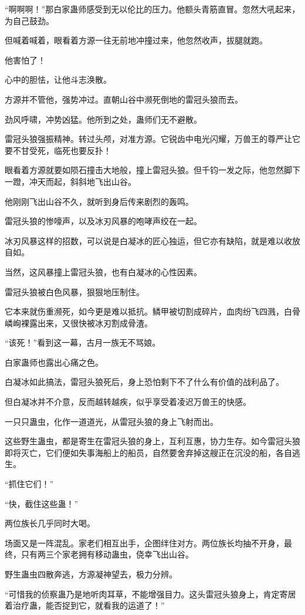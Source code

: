 \begin{this_body}
“啊啊啊！”那白家蛊师感受到无以伦比的压力。他额头青筋直冒。忽然大吼起来，为自己鼓劲。

但喊着喊着，眼看着方源一往无前地冲撞过来，他忽然收声，拔腿就跑。

他害怕了！

心中的胆怯，让他斗志涣散。

方源并不管他，强势冲过。直朝山谷中濒死倒地的雷冠头狼而去。

劲风呼啸，冲势凶猛。他所到之处，蛊师们无不避散。

雷冠头狼强振精神。转过头颅，对准方源。它锐齿中电光闪耀，万兽王的尊严让它要不甘受死，临死也要反扑！

眼看着方源就要如陨石撞击大地般，撞上雷冠头狼。但千钧一发之际，他忽然脚下一蹬，冲天而起，斜斜地飞出山谷。

他刚刚飞出山谷不久，就听到身后传来剧烈的轰鸣。

雷冠头狼的惨嚎声，以及冰刃风暴的咆哮声绞在一起。

冰刃风暴这样的招数，可以说是白凝冰的匠心独运，但它亦有缺陷，就是难以收放自如。

当然，这风暴撞上雷冠头狼，也有白凝冰的心性因素。

雷冠头狼被白色风暴，狠狠地压制住。

它本来就伤重濒死，如今更是难以抵抗。鳞甲被切割成碎片，血肉纷飞四溅，白骨嶙峋裸露出来，又很快被冰刃割成骨渣。

“该死！”看到这一幕，古月一族无不骂娘。

白家蛊师也露出心痛之色。

白凝冰如此搞法，雷冠头狼死后，身上恐怕剩下不了什么有价值的战利品了。

但白凝冰并不介意，反而越转越疾，似乎享受着凌迟万兽王的快感。

一只只蛊虫，化作一道道光，从雷冠头狼的身上飞射而出。

这些野生蛊虫，都是寄生在雷冠头狼的身上，互利互惠，协力生存。如今雷冠头狼即将灭亡，它们便如失事海船上的船员，自然要舍弃掉这艘正在沉没的船，各自逃生。

“抓住它们！”

“快，截住这些蛊！”

两位族长几乎同时大喝。

场面又是一阵混乱。家老们相互出手，企图绊住对方。两位族长均抽不开身，最终，只有两三个家老拥有移动蛊虫，侥幸飞出山谷。

野生蛊虫四散奔逃，方源凝神望去，极力分辨。

“可惜我的侦察蛊乃是地听肉耳草，不能增强目力。这头雷冠头狼身上，肯定寄居着治疗蛊，能否捉到它，就看我的运道了！”


\end{this_body}
